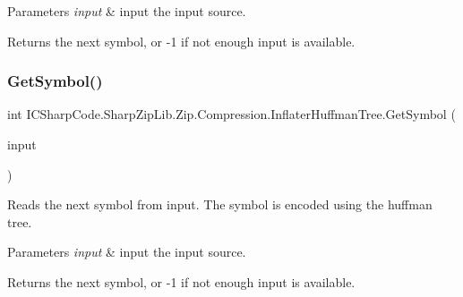 \begin{DoxyParams}{Parameters}
{\em input} & input the input source. \\
\hline
\end{DoxyParams}
\begin{DoxyReturn}{Returns}
the next symbol, or -\/1 if not enough input is available. 
\end{DoxyReturn}
\mbox{\label{class_i_c_sharp_code_1_1_sharp_zip_lib_1_1_zip_1_1_compression_1_1_inflater_huffman_tree_a2502c53f425e721c34ccfee00355ae3a}} 
\subsubsection{\texorpdfstring{Get\+Symbol()}{GetSymbol()}\hspace{0.1cm}{\footnotesize\ttfamily [2/2]}}
{\footnotesize\ttfamily int I\+C\+Sharp\+Code.\+Sharp\+Zip\+Lib.\+Zip.\+Compression.\+Inflater\+Huffman\+Tree.\+Get\+Symbol (\begin{DoxyParamCaption}\item[{\hyperlink{class_i_c_sharp_code_1_1_sharp_zip_lib_1_1_zip_1_1_compression_1_1_streams_1_1_stream_manipulator}{Stream\+Manipulator}}]{input }\end{DoxyParamCaption})\hspace{0.3cm}{\ttfamily [inline]}}



Reads the next symbol from input. The symbol is encoded using the huffman tree. 


\begin{DoxyParams}{Parameters}
{\em input} & input the input source. \\
\hline
\end{DoxyParams}
\begin{DoxyReturn}{Returns}
the next symbol, or -\/1 if not enough input is available. 
\end{DoxyReturn}


